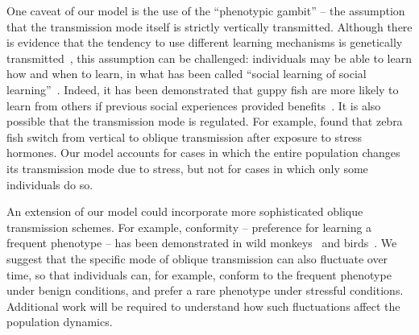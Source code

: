 \documentclass[12pt]{extarticle} %
\makeatletter
\renewcommand\section{\@startsection {section}{1}{\z@}%
     {-2.5ex \@plus -1ex \@minus -.2ex}%
     {1.3ex \@plus.2ex}%
    {\Large\bfseries}}
\makeatother
\begin{document}
One caveat of our model is the use of the ``phenotypic gambit'' -- the assumption that the transmission mode itself is strictly vertically transmitted.
Although there is evidence that the tendency to use different learning mechanisms is genetically transmitted~\citep{Foucaud2013}, this assumption can be challenged: individuals may be able to learn how and when to learn, in what has been called ``social learning of social learning''~\citep{Mesoudi2016}.
Indeed, it has been demonstrated that guppy fish are more likely to learn from others if previous social experiences provided benefits~\citep{Leris2016}.
It is also possible that the transmission mode is regulated.
For example, \citet{Farine2015} found that zebra fish switch from vertical to oblique transmission after exposure to stress hormones.
Our model accounts for cases in which the entire population changes its transmission mode due to stress, but not for cases in which only some individuals do so.

An extension of our model could incorporate more sophisticated oblique transmission schemes.
For example, conformity -- preference for learning a frequent phenotype -- has been demonstrated in wild monkeys~\citep{VanDeWaal2013} and birds~\citep{Aplin2015}.
We suggest that the specific mode of oblique transmission can also fluctuate over time, so that individuals can, for example, conform to the frequent phenotype under benign conditions, and prefer a rare phenotype under stressful conditions.
Additional work will be required to understand how such fluctuations affect the population dynamics. 


%


%

\end{document}
